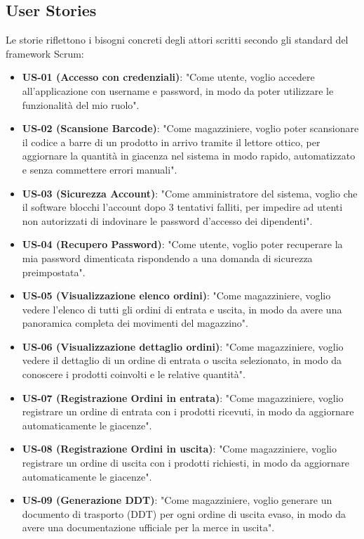 \documentclass[a4paper,12pt]{article}
\begin{document}
\subsection{User Stories}
Le storie riflettono i bisogni concreti degli attori scritti secondo gli standard del framework Scrum:
\begin{itemize}
    \item \textbf{US-01 (Accesso con credenziali)}: "Come utente, voglio accedere all'applicazione con username e password, in modo da poter utilizzare le funzionalità del mio ruolo".
    \item \textbf{US-02 (Scansione Barcode)}: "Come magazziniere, voglio poter scansionare il codice a barre di un prodotto in arrivo tramite il lettore ottico, per aggiornare la quantità in giacenza nel sistema in modo rapido, automatizzato e senza commettere errori manuali".
    \item \textbf{US-03 (Sicurezza Account)}: "Come amministratore del sistema, voglio che il software blocchi l'account dopo 3 tentativi falliti, per impedire ad utenti non autorizzati di indovinare le password d'accesso dei dipendenti".
    \item \textbf{US-04 (Recupero Password)}: "Come utente, voglio poter recuperare la mia password dimenticata rispondendo a una domanda di sicurezza preimpostata".
    \item \textbf{US-05 (Visualizzazione elenco ordini)}: "Come magazziniere, voglio vedere l'elenco di tutti gli ordini di entrata e uscita, in modo da avere una panoramica completa dei movimenti del magazzino".
    \item \textbf{US-06 (Visualizzazione dettaglio ordini)}: "Come magazziniere, voglio vedere il dettaglio di un ordine di entrata o uscita selezionato, in modo da conoscere i prodotti coinvolti e le relative quantità".
    \item \textbf{US-07 (Registrazione Ordini in entrata)}: "Come magazziniere, voglio registrare un ordine di entrata con i prodotti ricevuti, in modo da aggiornare automaticamente le giacenze".
    \item \textbf{US-08 (Registrazione Ordini in uscita)}: "Come magazziniere, voglio registrare un ordine di uscita con i prodotti richiesti, in modo da aggiornare automaticamente le giacenze".
    \item \textbf{US-09 (Generazione DDT)}: "Come magazziniere, voglio generare un documento di trasporto (DDT) per ogni ordine di uscita evaso, in modo da avere una documentazione ufficiale per la merce in uscita".

\end{itemize}
\end{document}
